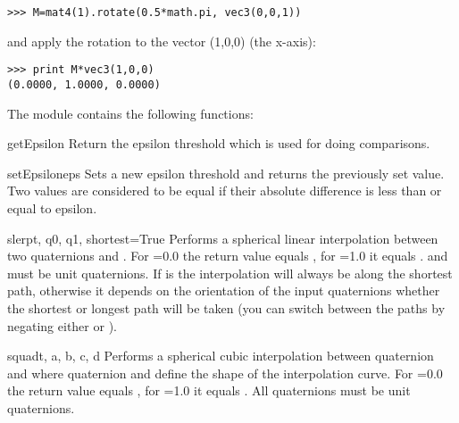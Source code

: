 \begin{verbatim}
>>> M=mat4(1).rotate(0.5*math.pi, vec3(0,0,1))
\end{verbatim}

and apply the rotation to the vector (1,0,0) (the x-axis):

\begin{verbatim}
>>> print M*vec3(1,0,0)
(0.0000, 1.0000, 0.0000)
\end{verbatim}

The module contains the following functions:

\begin{funcdesc}{getEpsilon}{}
Return the epsilon threshold which is used for doing comparisons.
\end{funcdesc}

\begin{funcdesc}{setEpsilon}{eps}
Sets a new epsilon threshold and returns the previously set value. Two
values are considered to be equal if their absolute difference is less
than or equal to epsilon.
\end{funcdesc}

\begin{funcdesc}{slerp}{t, q0, q1, shortest=True}
Performs a spherical linear interpolation between two quaternions 
and . For =0.0 the return value equals , for 
=1.0 it equals .  and  must be unit 
quaternions. If  is  the interpolation will always
be along the shortest path, otherwise it depends on the orientation of
the input quaternions whether the shortest or longest path will be taken
(you can switch between the paths by negating either  or ).
\end{funcdesc}

\begin{funcdesc}{squad}{t, a, b, c, d}
Performs a spherical cubic interpolation between quaternion  and 
where quaternion  and  define the shape of the interpolation
curve. For =0.0 the return value equals , for =1.0 it 
equals . All quaternions must be unit quaternions.
\end{funcdesc}










